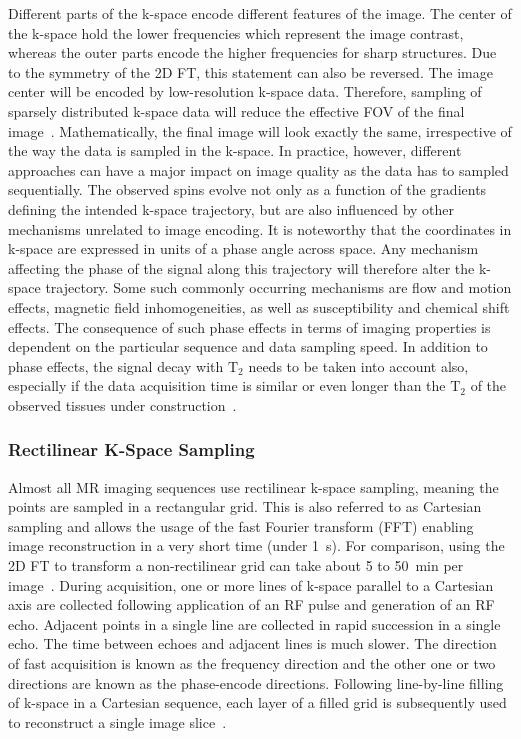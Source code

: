 Different parts of the k-space encode different features of the image. The center of the k-space hold the lower frequencies which represent the image contrast, whereas the outer parts encode the higher frequencies for sharp structures. Due to the symmetry of the 2D FT, this statement can also be reversed. The image center will be encoded by low-resolution k-space data. Therefore, sampling of sparsely distributed k-space data will reduce the effective FOV of the final image~\cite{AdvancesPI,SamplingStrategies}. Mathematically, the final image will look exactly the same, irrespective of the way the data is sampled in the k-space. In practice, however, different approaches can have a major impact on image quality as the data has to sampled sequentially. The observed spins evolve not only as a function of the gradients defining the intended k-space trajectory, but are also influenced by other mechanisms unrelated to image encoding. It is noteworthy that the coordinates in k-space are expressed in units of a phase angle across space. Any mechanism affecting the phase of the signal along this trajectory will therefore alter the k-space trajectory. Some such commonly occurring mechanisms are flow and motion effects, magnetic field inhomogeneities, as well as susceptibility and chemical shift effects. The consequence of such phase effects in terms of imaging properties is dependent on the particular sequence and data sampling speed. In addition to phase effects, the signal decay with $\text{T}_2$ needs to be taken into account also, especially if the data acquisition time is similar or even longer than the $\text{T}_2$ of the observed tissues under construction~\cite{SamplingStrategies}.


\subsubsection{Rectilinear K-Space Sampling}
Almost all MR imaging sequences use rectilinear k-space sampling, meaning the points are sampled in a rectangular grid. This 
is also referred to as Cartesian sampling and allows the usage of the fast Fourier transform (FFT) enabling image reconstruction in a very short time (under 1~s). For comparison, using the 2D FT to transform a non-rectilinear grid can take about 5 to 50~min per image~\cite{SamplingStrategies}. During acquisition, one or more lines of k-space parallel to a Cartesian axis are collected following application of an RF pulse and generation of an RF echo. Adjacent points in a single line are collected in rapid succession in a single echo. The time between echoes and adjacent lines is much slower. The direction of fast acquisition is known as the frequency direction and the other one or two directions are known as the phase-encode directions. Following line-by-line filling of k-space in a Cartesian sequence, each layer of a filled grid is subsequently used to reconstruct a single image slice~\cite{Bardo2021}.


